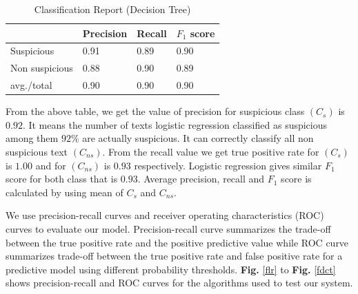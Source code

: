 \begin{table}[h!]
\begin{center}
\caption{Classification Report (Decision Tree)}
\begin{tabular}{|m{2.8cm} | m{1.5cm}| m{1.3cm}| m{1.5cm}|}
\hline
     & Precision & Recall & $F_1$ score\\
\hline
     Suspicious & 0.91 & 0.89 & 0.90\\
\hline 
     Non suspicious  & 0.88 & 0.90 & 0.89\\
\hline 
     avg./total & 0.90 & 0.90 & 0.90\\
\hline
\end{tabular}
\label{tdct}
\end{center}
\end{table}
\fi
From the above table, we get the value of precision for suspicious class $(C_s)$ is $0.92$. It means the number of texts logistic regression classified as suspicious among them $92\%$ are actually suspicious. It can correctly classify all non suspicious text $(C_{ns})$. From the recall value we get true positive rate for $(C_s)$ is $1.00$ and for $(C_{ns})$ is $0.93$ respectively. Logistic regression gives similar $F_1$ score for both class that is $0.93$. Average precision, recall and $F_1$ score is calculated by using mean of $C_s$ and $C_{ns}$.\par

We use precision-recall curves and receiver operating characteristics (ROC) curves to evaluate our model. Precision-recall curve summarizes the trade-off between the true positive rate and the positive predictive value  while ROC curve summarizes trade-off between the true positive rate and false positive rate for a predictive model using different probability thresholds. \textbf{Fig.} \ref{flr} to \textbf{Fig.} \ref{fdct} shows precision-recall and ROC curves for the algorithms used to test our system.

